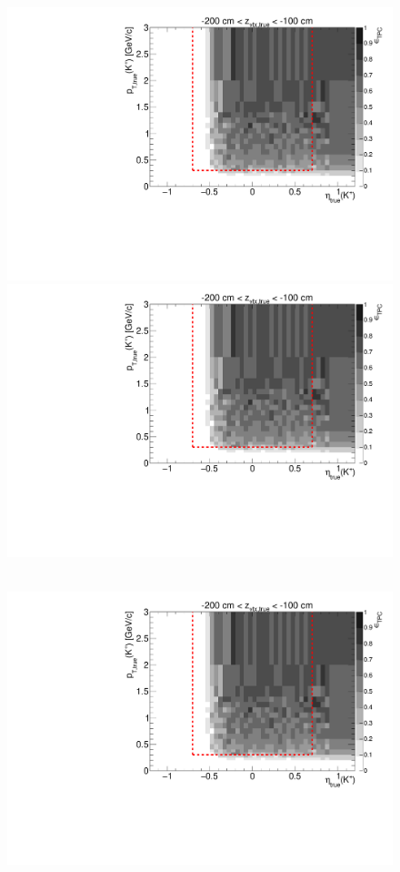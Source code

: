 \begin{figure}[hb]
{  \includegraphics[width=\linewidth,page=7]{graphics/eff/Eff2D_TPC_kaon_Plus.pdf}\\
  \includegraphics[width=\linewidth,page=9]{graphics/eff/Eff2D_TPC_kaon_Plus.pdf}
}~
\parbox{0.495\textwidth}{
  \centering
  \includegraphics[width=\linewidth,page=4]{graphics/eff/Eff2D_TPC_kaon_Plus.pdf}\\
}
\end{figure}
